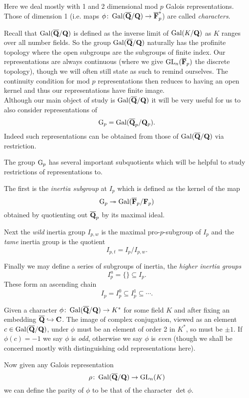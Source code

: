 \documentclass[a4paper,12pt]{article}
\begin{document}
Here we deal mostly with 1 and 2 dimensional mod $p$ Galois representations.
Those of dimension 1 (i.e. maps $\phi\colon\operatorname{Gal}(\overline{\mathbf{Q}}/\mathbf{Q}) \to \overline{\mathbf{F}}_p^*$) are called \emph{characters}.

Recall that $\operatorname{Gal}(\overline{\mathbf{Q}}/\mathbf{Q})$ is defined as the inverse limit of $\operatorname{Gal}(K/\mathbf{Q})$ as $K$ ranges over all number fields.
So the group $\operatorname{Gal}(\overline{\mathbf{Q}}/\mathbf{Q})$ naturally has the profinite topology where the open subgroups are the subgroups of finite index.
Our representations are always continuous (where we give $\operatorname{GL}_n(\overline{\mathbf{F}}_p)$ the discrete topology), though we will often still state as such to remind ourselves.
The continuity condition for mod $p$ representations then reduces to having an open kernel and thus our representations have finite image.\\

Although our main object of study is $\operatorname{Gal}(\overline{\mathbf{Q}}/\mathbf{Q})$ it will be very useful for us to also consider representations of
\[
\mathrm{G}_p = \operatorname{Gal}(\overline{\mathbf{Q}}_p/\mathbf{Q}_p).
\]
Indeed such representations can be obtained from those of $\operatorname{Gal}(\overline{\mathbf{Q}}/\mathbf{Q})$ via restriction.

The group $\mathrm{G}_p$ has several important subquotients which will be helpful to study restrictions of representations to.
\begin{defn}\label{defn-inert}
The first is the \emph{inertia subgroup} at $I_p$ which is defined as the kernel of the map
\[
\mathrm{G}_p \twoheadrightarrow \operatorname{Gal}(\overline{\mathbf{F}}_p/\mathbf{F}_p)
\]
obtained by quotienting out $\overline{\mathbf{Q}}_p$ by its maximal ideal.

Next the \emph{wild} inertia group $I_{p,w}$ is the maximal pro-$p$-subgroup of $I_p$ and the \emph{tame} inertia group is the quotient
\[
I_{p,t} = I_p / I_{p,w}.
\]

Finally we may define a series of subgroups of inertia, the \emph{higher inertia groups}
\[
I_p^u = \{\}\subseteq I_p.
\]
These form an ascending chain
\[
I_p = I_p^0 \subseteq I_p^1 \subseteq \cdots.
\]
\end{defn}

\begin{defn}
Given a character $\phi\colon\operatorname{Gal}(\overline{\mathbf{Q}}/\mathbf{Q}) \to K^*$ for some field $K$ and after fixing an embedding $\overline{\mathbf{Q}}\hookrightarrow \mathbf{C}$.
The image of complex conjugation, viewed as an element $c\in \operatorname{Gal}(\overline{\mathbf{Q}}/\mathbf{Q})$, under $\phi$ must be an element of order 2 in $K^*$, so must be $\pm 1$.
If $\phi(c) = -1$ we say $\phi$ is \emph{odd}, otherwise we say $\phi$  is \emph{even} (though we shall be concerned mostly with distinguishing odd representations here).

Now given any Galois representation
\[
\rho\colon\operatorname{Gal}(\overline{\mathbf{Q}}/\mathbf{Q}) \to \operatorname{GL}_n(K)
\]
we can define the parity of $\phi$ to be that of the character $\det\phi$.
\end{defn}
\end{document}
